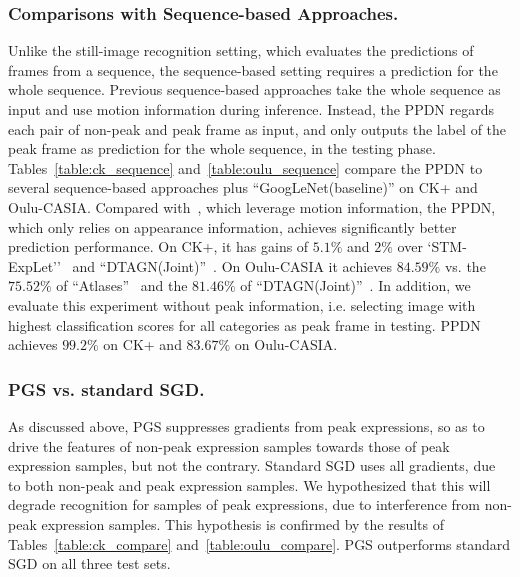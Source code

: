 \documentclass[runningheads]{llncs}
\begin{document}
\subsubsection{Comparisons with Sequence-based Approaches.} Unlike the 
still-image recognition setting, which evaluates the predictions of frames 
from a sequence, the sequence-based setting requires a prediction for the
whole sequence. Previous sequence-based approaches take the whole sequence 
as input and use motion information during inference. Instead, the PPDN 
regards each pair of non-peak and peak frame as input, and only outputs
the label of the peak frame as prediction for the whole sequence, in the 
testing phase. %
Tables~\ref{table:ck_sequence} and~\ref{table:oulu_sequence} compare
the PPDN to several sequence-based approaches plus ``GoogLeNet(baseline)'' 
on CK+ and Oulu-CASIA. Compared with~\cite{liu2014learning,liu2014deeply,jung2015joint}, which leverage motion information, the PPDN, which only relies on  
appearance information, achieves significantly better prediction performance.
On CK+, it has gains of $5.1\%$ and $2\%$ over 
`STM-ExpLet''~\cite{liu2014learning} and 
``DTAGN(Joint)''~\cite{jung2015joint}. On Oulu-CASIA it achieves
$84.59\%$ vs. the $75.52\%$ of ``Atlases''~\cite{guo2012dynamic} and 
the $81.46\%$ of ``DTAGN(Joint)''~\cite{jung2015joint}. In addition, we evaluate this experiment without peak information, i.e. selecting image with highest classification scores for all categories as peak frame in testing. PPDN achieves $99.2\%$ on CK+ and $83.67\%$ on Oulu-CASIA.

\subsubsection{PGS vs. standard SGD.} As discussed above, PGS suppresses gradients
from peak expressions, so as to drive the features of non-peak 
expression samples towards those of peak expression samples, but not the
contrary. Standard SGD uses all gradients, due to both non-peak and peak 
expression samples. We hypothesized that this will degrade recognition 
for samples of peak expressions, due to interference from non-peak 
expression samples. This hypothesis is confirmed by the results
of Tables~\ref{table:ck_compare} and~\ref{table:oulu_compare}. 
PGS outperforms standard SGD on all three test sets.
\end{document}
